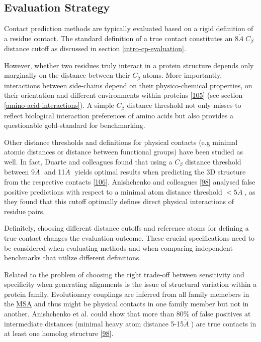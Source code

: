 \documentclass[12pt,a4paper,twoside]{book}
\newcommand{\Cb}{C_\beta}
\newcommand{\angstrom}{\mathring{A} \;}
\theoremstyle{definition}
\theoremstyle{definition}
\theoremstyle{remark}
\begin{document}
\subsection*{Evaluation Strategy}\label{evaluation-strategy}

Contact prediction methods are typically evaluated based on a rigid
definition of a residue contact. The standard definition of a true
contact constitutes an \(8\angstrom \Cb\) distance cutoff as discussed
in section \ref{intro-cp-evaluation}.

However, whether two residues truly interact in a protein structure
depends only marginally on the distance between their \(\Cb\) atoms.
More importantly, interactions between side-chains depend on their
physico-chemical properties, on their orientation and different
environments within proteins {[}\protect\hyperlink{ref-Bettsa}{105}{]}
(see section \ref{amino-acid-interactions}). A simple \(\Cb\) distance
threshold not only misses to reflect biological interaction preferences
of amino acids but also provides a questionable gold-standard for
benchmarking.

Other distance thresholds and definitions for physical contacts (e.g
minimal atomic distances or distance between functional groups) have
been studied as well. In fact, Duarte and colleagues found that using a
\(\Cb\) distance threshold between 9\(\angstrom\) and 11\(\angstrom\)
yields optimal results when predicting the 3D structure from the
respective contacts {[}\protect\hyperlink{ref-Duarte2010}{106}{]}.
Anishchenko and colleagues
{[}\protect\hyperlink{ref-Anishchenko2017}{98}{]} analysed false
positive predictions with respect to a minimal atom distance threshold
\(< 5 \angstrom\), as they found that this cutoff optimally defines
direct physical interactions of residue pairs.

Definitely, choosing different distance cutoffs and reference atoms for
defining a true contact changes the evaluation outcome. These crucial
specifications need to be considered when evaluating methods and when
comparing independent benchmarks that utilize different definitions.

Related to the problem of choosing the right trade-off between
sensitivity and specificity when generating alignments is the issue of
structural variation within a protein family. Evolutionary couplings are
inferred from all family memebers in the \protect\hyperlink{abbrev}{MSA}
and thus might be physical contacts in one family member but not in
another. Anishchenko et al. could show that more than \(80\%\) of false
positives at intermediate distances (minimal heavy atom distance
5-15\(\angstrom\)) are true contacts in at least one homolog structure
{[}\protect\hyperlink{ref-Anishchenko2017}{98}{]}.
\end{document}
